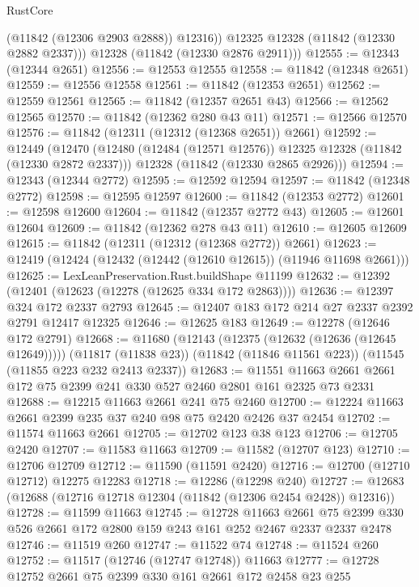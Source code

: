 \begin{lexlean}{RustCore}
\begin{coremodule}
            (@11842 (@12306 @2903 @2888))
            @12316))
        @12325
        @12328
        (@11842 (@12330 @2882 @2337)))
      @12328
      (@11842 (@12330 @2876 @2911)))
@12555 := @12343 (@12344 @2651)
@12556 := @12553 @12555
@12558 := @11842 (@12348 @2651)
@12559 := @12556 @12558
@12561 := @11842 (@12353 @2651)
@12562 := @12559 @12561
@12565 := @11842 (@12357 @2651 @43)
@12566 := @12562 @12565
@12570 := @11842 (@12362 @280 @43 @11)
@12571 := @12566 @12570
@12576 := @11842 (@12311 (@12312 (@12368 @2651)) @2661)
@12592 := @12449
    (@12470
      (@12480 (@12484 (@12571 @12576)) @12325 @12328 (@11842 (@12330 @2872 @2337)))
      @12328
      (@11842 (@12330 @2865 @2926)))
@12594 := @12343 (@12344 @2772)
@12595 := @12592 @12594
@12597 := @11842 (@12348 @2772)
@12598 := @12595 @12597
@12600 := @11842 (@12353 @2772)
@12601 := @12598 @12600
@12604 := @11842 (@12357 @2772 @43)
@12605 := @12601 @12604
@12609 := @11842 (@12362 @278 @43 @11)
@12610 := @12605 @12609
@12615 := @11842 (@12311 (@12312 (@12368 @2772)) @2661)
@12623 := @12419 (@12424 (@12432 (@12442 (@12610 @12615)) (@11946 @11698 @2661)))
@12625 := LexLeanPreservation.Rust.buildShape @11199
@12632 := @12392 (@12401 (@12623 (@12278 (@12625 @334 @172 @2863))))
@12636 := @12397 @324 @172 @2337 @2793
@12645 := @12407 @183 @172 @214 @27 @2337 @2392 @2791 @12417 @12325
@12646 := @12625 @183
@12649 := @12278 (@12646 @172 @2791)
@12668 := @11680
    (@12143 (@12375 (@12632 (@12636 (@12645 @12649)))))
    (@11817 (@11838 @23))
    (@11842 (@11846 @11561 @223))
    (@11545 (@11855 @223 @232 @2413 @2337))
@12683 := @11551 @11663 @2661 @2661 @172 @75 @2399 @241 @330 @527 @2460 @2801 @161 @2325 @73 @2331
@12688 := @12215 @11663 @2661 @241 @75 @2460
@12700 := @12224 @11663 @2661 @2399 @235 @37 @240 @98 @75 @2420 @2426 @37 @2454
@12702 := @11574 @11663 @2661
@12705 := @12702 @123 @38 @123
@12706 := @12705 @2420
@12707 := @11583 @11663
@12709 := @11582 (@12707 @123)
@12710 := @12706 @12709
@12712 := @11590 (@11591 @2420)
@12716 := @12700 (@12710 @12712) @12275 @12283
@12718 := @12286 (@12298 @240)
@12727 := @12683 (@12688 (@12716 @12718 @12304 (@11842 (@12306 @2454 @2428)) @12316))
@12728 := @11599 @11663
@12745 := @12728
    @11663
    @2661
    @75
    @2399
    @330
    @526
    @2661
    @172
    @2800
    @159
    @243
    @161
    @252
    @2467
    @2337
    @2337
    @2478
@12746 := @11519 @260
@12747 := @11522 @74
@12748 := @11524 @260
@12752 := @11517 (@12746 (@12747 @12748)) @11663
@12777 := @12728
    @12752
    @2661
    @75
    @2399
    @330
    @161
    @2661
    @172
    @2458
    @23
    @255

\end{coremodule}
\end{lexlean}

